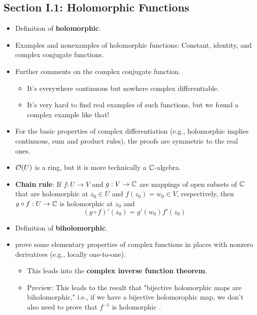 \documentclass[../notes.tex]{subfiles}
\begin{document}
\subsection*{Section I.1: Holomorphic Functions}
\begin{itemize}
    \item {}Definition of \textbf{holomorphic}.
    \item Examples and nonexamples of holomorphic functions: Constant, identity, and complex conjugate functions.
    \item Further comments on the complex conjugate function.
    \begin{itemize}
        \item It's everywhere continuous but nowhere complex differentiable.
        \item It's very hard to find real examples of such functions, but we found a complex example like that!
    \end{itemize}
    \item For the basic properties of complex differentiation (e.g., holomorphic implies continuous, sum and product rules), the proofs are symmetric to the real ones.
    \item $\mathcal{O}(U)$ is a ring, but it is more technically a $\mathbb{C}$-algebra.
    \item \textbf{Chain rule}: If $f:U\to V$ and $g:V\to\mathbb{C}$ are mappings of open subsets of $\mathbb{C}$ that are holomorphic at $z_0\in U$ and $f(z_0)=w_0\in V$, respectively, then $g\circ f:U\to\mathbb{C}$ is holomorphic at $z_0$ and
    \begin{equation*}
        (g\circ f)'(z_0) = g'(w_0)f'(z_0)
    \end{equation*}
    \item Definition of \textbf{biholomorphic}.
    \item \textcite{bib:FischerLieb} prove some elementary properties of complex functions in places with nonzero derivatives (e.g., locally one-to-one).
    \begin{itemize}
        \item This leads into the \textbf{complex inverse function theorem}.
        \item Preview: This leads to the result that "bijective holomorphic maps are biholomorphic," i.e., if we have a bijective holomorophic map, we don't also need to prove that $f^{-1}$ is holomorphic \parencite[6]{bib:FischerLieb}.
    \end{itemize}
\end{itemize}
\end{document}
